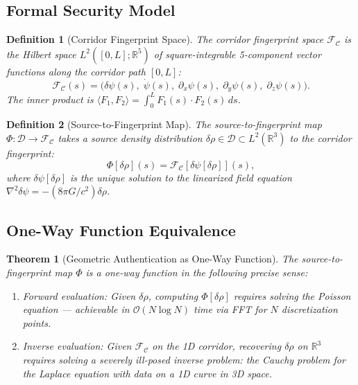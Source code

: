 \documentclass[twocolumn,superscriptaddress,prd,nofootinbib]{revtex4-2}
\newcommand{\order}[1]{\mathcal{O}(#1)}
\newcommand{\Corridor}{\mathcal{C}}
\newcommand{\Fingerprint}{\mathcal{F}}
\newtheorem{theorem}{Theorem}
\newtheorem{definition}{Definition}
\begin{document}
\subsection{Formal Security Model}

\begin{definition}[Corridor Fingerprint Space]
The corridor fingerprint space $\mathcal{F}_\Corridor$ is the
Hilbert space $L^2([0,L]; \mathbb{R}^5)$ of square-integrable
5-component vector functions along the corridor path $[0,L]$:
\begin{equation}
\Fingerprint_\Corridor(s) = \bigl(\delta\psi(s),\;\dot\psi(s),\;
\partial_x\psi(s),\;\partial_y\psi(s),\;\partial_z\psi(s)\bigr).
\end{equation}
The inner product is
$\langle F_1, F_2\rangle = \int_0^L F_1(s)\cdot F_2(s)\,ds$.
\end{definition}

\begin{definition}[Source-to-Fingerprint Map]
The source-to-fingerprint map $\Phi: \mathcal{D} \to \mathcal{F}_\Corridor$
takes a source density distribution $\delta\rho \in \mathcal{D}
\subset L^2(\mathbb{R}^3)$ to the corridor fingerprint:
\begin{equation}
\Phi[\delta\rho](s) = \Fingerprint_\Corridor[\delta\psi[\delta\rho]](s),
\end{equation}
where $\delta\psi[\delta\rho]$ is the unique solution to the linearized
field equation $\nabla^2\delta\psi = -(8\pi G/c^2)\delta\rho$.
\end{definition}

\subsection{One-Way Function Equivalence}

\begin{theorem}[Geometric Authentication as One-Way Function]
\label{thm:one-way}
The source-to-fingerprint map $\Phi$ is a one-way function in the
following precise sense:
\begin{enumerate}
\item \emph{Forward evaluation:} Given $\delta\rho$, computing
$\Phi[\delta\rho]$ requires solving the Poisson equation --- achievable
in $\order{N\log N}$ time via FFT for $N$ discretization points.
\item \emph{Inverse evaluation:} Given $\Fingerprint_\Corridor$ on the
1D corridor, recovering $\delta\rho$ on $\mathbb{R}^3$ requires solving
a severely ill-posed inverse problem: the Cauchy problem for the Laplace
equation with data on a 1D curve in 3D space.
\end{enumerate}
\end{theorem}
\end{document}
